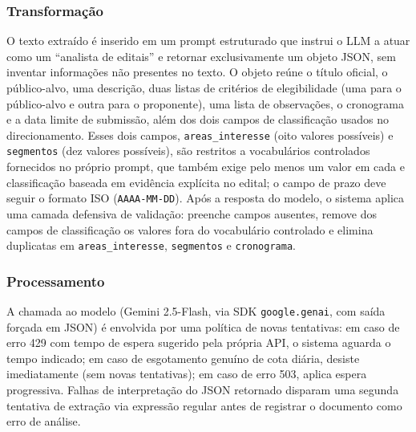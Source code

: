 \documentclass[12pt]{article}
\begin{document}
  \subsubsection{Transformação}\label{sec:transformacao}
  O texto extraído é inserido em um prompt estruturado que instrui o LLM a atuar como um ``analista de editais'' e retornar exclusivamente um objeto JSON, sem inventar informações não presentes no texto. O objeto reúne o título oficial, o público-alvo, uma descrição, duas listas de critérios de elegibilidade (uma para o público-alvo e outra para o proponente), uma lista de observações, o cronograma e a data limite de submissão, além dos dois campos de classificação usados no direcionamento. Esses dois campos, \texttt{areas\_interesse} (oito valores possíveis) e \texttt{segmentos} (dez valores possíveis), são restritos a vocabulários controlados fornecidos no próprio prompt, que também exige pelo menos um valor em cada e classificação baseada em evidência explícita no edital; o campo de prazo deve seguir o formato ISO (\texttt{AAAA-MM-DD}). Após a resposta do modelo, o sistema aplica uma camada defensiva de validação: preenche campos ausentes, remove dos campos de classificação os valores fora do vocabulário controlado e elimina duplicatas em \texttt{areas\_interesse}, \texttt{segmentos} e \texttt{cronograma}.

  \subsubsection{Processamento}\label{sec:processamento}
  A chamada ao modelo (Gemini 2.5-Flash, via SDK \texttt{google.genai}, com saída forçada em JSON) é envolvida por uma política de novas tentativas: em caso de erro 429 com tempo de espera sugerido pela própria API, o sistema aguarda o tempo indicado; em caso de esgotamento genuíno de cota diária, desiste imediatamente (sem novas tentativas); em caso de erro 503, aplica espera progressiva. Falhas de interpretação do JSON retornado disparam uma segunda tentativa de extração via expressão regular antes de registrar o documento como erro de análise.
\end{document}
